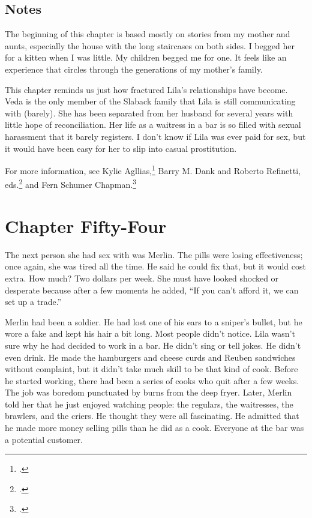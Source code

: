 \documentclass[
  american,
  letterpaper,
]{book}
\begin{document}
\section{Notes}\label{notes-55}

The beginning of this chapter is based mostly on stories from my mother
and aunts, especially the house with the long staircases on both sides.
I begged her for a kitten when I was little. My children begged me for
one. It feels like an experience that circles through the generations of
my mother's family.

This chapter reminds us just how fractured Lila's relationships have
become. Veda is the only member of the Slaback family that Lila is still
communicating with (barely). She has been separated from her husband for
several years with little hope of reconciliation. Her life as a waitress
in a bar is so filled with sexual harassment that it barely registers. I
don't know if Lila was ever paid for sex, but it would have been easy
for her to slip into casual prostitution.

For more information, see Kylie Agllias,\footnote{.} Barry M. Dank and Roberto Refinetti, eds.\footnote{.} and Fern
Schumer Chapman.\footnote{.}


\chapter{Chapter Fifty-Four}\label{chapter-fifty-four}

The next person she had sex with was Merlin. The pills were losing
effectiveness; once again, she was tired all the time. He said he could
fix that, but it would cost extra. How much? Two dollars per week. She
must have looked shocked or desperate because after a few moments he
added, ``If you can't afford it, we can set up a trade.''

Merlin had been a soldier. He had lost one of his ears to a sniper's
bullet, but he wore a fake and kept his hair a bit long. Most people
didn't notice. Lila wasn't sure why he had decided to work in a bar. He
didn't sing or tell jokes. He didn't even drink. He made the hamburgers
and cheese curds and Reuben sandwiches without complaint, but it didn't
take much skill to be that kind of cook. Before he started working,
there had been a series of cooks who quit after a few weeks. The job was
boredom punctuated by burns from the deep fryer. Later, Merlin told her
that he just enjoyed watching people: the regulars, the waitresses, the
brawlers, and the criers. He thought they were all fascinating. He
admitted that he made more money selling pills than he did as a cook.
Everyone at the bar was a potential customer.
\end{document}
